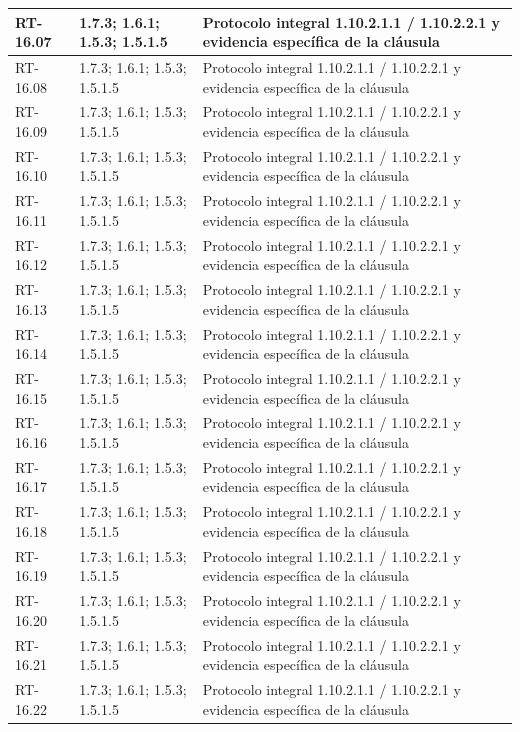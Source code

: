 \begin{longtable}{L{23mm}L{46mm}L{72mm}}
RT-16.07 & 1.7.3; 1.6.1; 1.5.3; 1.5.1.5 & Protocolo integral 1.10.2.1.1 / 1.10.2.2.1 y evidencia específica de la cláusula\\\hline
RT-16.08 & 1.7.3; 1.6.1; 1.5.3; 1.5.1.5 & Protocolo integral 1.10.2.1.1 / 1.10.2.2.1 y evidencia específica de la cláusula\\\hline
RT-16.09 & 1.7.3; 1.6.1; 1.5.3; 1.5.1.5 & Protocolo integral 1.10.2.1.1 / 1.10.2.2.1 y evidencia específica de la cláusula\\\hline
RT-16.10 & 1.7.3; 1.6.1; 1.5.3; 1.5.1.5 & Protocolo integral 1.10.2.1.1 / 1.10.2.2.1 y evidencia específica de la cláusula\\\hline
RT-16.11 & 1.7.3; 1.6.1; 1.5.3; 1.5.1.5 & Protocolo integral 1.10.2.1.1 / 1.10.2.2.1 y evidencia específica de la cláusula\\\hline
RT-16.12 & 1.7.3; 1.6.1; 1.5.3; 1.5.1.5 & Protocolo integral 1.10.2.1.1 / 1.10.2.2.1 y evidencia específica de la cláusula\\\hline
RT-16.13 & 1.7.3; 1.6.1; 1.5.3; 1.5.1.5 & Protocolo integral 1.10.2.1.1 / 1.10.2.2.1 y evidencia específica de la cláusula\\\hline
RT-16.14 & 1.7.3; 1.6.1; 1.5.3; 1.5.1.5 & Protocolo integral 1.10.2.1.1 / 1.10.2.2.1 y evidencia específica de la cláusula\\\hline
RT-16.15 & 1.7.3; 1.6.1; 1.5.3; 1.5.1.5 & Protocolo integral 1.10.2.1.1 / 1.10.2.2.1 y evidencia específica de la cláusula\\\hline
RT-16.16 & 1.7.3; 1.6.1; 1.5.3; 1.5.1.5 & Protocolo integral 1.10.2.1.1 / 1.10.2.2.1 y evidencia específica de la cláusula\\\hline
RT-16.17 & 1.7.3; 1.6.1; 1.5.3; 1.5.1.5 & Protocolo integral 1.10.2.1.1 / 1.10.2.2.1 y evidencia específica de la cláusula\\\hline
RT-16.18 & 1.7.3; 1.6.1; 1.5.3; 1.5.1.5 & Protocolo integral 1.10.2.1.1 / 1.10.2.2.1 y evidencia específica de la cláusula\\\hline
RT-16.19 & 1.7.3; 1.6.1; 1.5.3; 1.5.1.5 & Protocolo integral 1.10.2.1.1 / 1.10.2.2.1 y evidencia específica de la cláusula\\\hline
RT-16.20 & 1.7.3; 1.6.1; 1.5.3; 1.5.1.5 & Protocolo integral 1.10.2.1.1 / 1.10.2.2.1 y evidencia específica de la cláusula\\\hline
RT-16.21 & 1.7.3; 1.6.1; 1.5.3; 1.5.1.5 & Protocolo integral 1.10.2.1.1 / 1.10.2.2.1 y evidencia específica de la cláusula\\\hline
RT-16.22 & 1.7.3; 1.6.1; 1.5.3; 1.5.1.5 & Protocolo integral 1.10.2.1.1 / 1.10.2.2.1 y evidencia específica de la cláusula\\\hline

\end{longtable}
